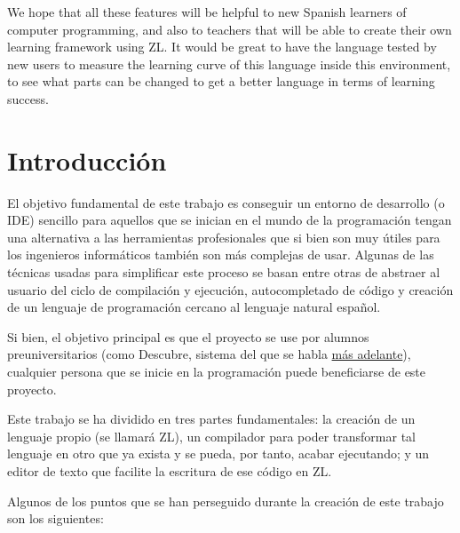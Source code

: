 \documentclass{report}
\begin{document}
	We hope that all these features will be helpful to new Spanish learners of computer programming, and also to teachers that will be able to create their own learning framework using ZL. It would be great to have the language tested by new users to measure the learning curve of this language inside this environment, to see what parts can be changed to get a better language in terms of learning success. 
	
	\chapter{Introducción}
	
	El objetivo fundamental de este trabajo es conseguir un entorno de desarrollo (o IDE) sencillo para aquellos que se inician en el mundo de la programación tengan una alternativa a las herramientas profesionales que si bien son muy útiles para los ingenieros informáticos también son más complejas de usar. Algunas de las técnicas usadas para simplificar este proceso se basan entre otras de abstraer al usuario del ciclo de compilación y ejecución, autocompletado de código y creación de un lenguaje de programación cercano al lenguaje natural español. 
	
	\vspace{10px}
	
	Si bien, el objetivo principal es que el proyecto se use por alumnos preuniversitarios (como Descubre, sistema del que se habla \hyperref[descubre]{más adelante}), cualquier persona que se inicie en la programación puede beneficiarse de este proyecto.
	
	\vspace{10px}
	
	Este trabajo se ha dividido en tres partes fundamentales: la creación de un lenguaje propio (se llamará ZL), un compilador para poder transformar tal lenguaje en otro que ya exista y se pueda, por tanto, acabar ejecutando; y un editor de texto que facilite la escritura de ese código en ZL.

	\vspace{10px}

	Algunos de los puntos que se han perseguido durante la creación de este trabajo son los siguientes:
	
\end{document}

